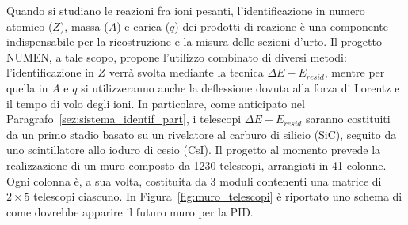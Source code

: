 




Quando si studiano le reazioni fra ioni pesanti, l'identificazione in numero atomico ($Z$), massa ($A$) e carica ($q$) dei prodotti di reazione è una componente indispensabile per la ricostruzione e la misura delle sezioni d'urto.
Il progetto NUMEN, a tale scopo, propone l'utilizzo combinato di diversi metodi: l'identificazione in $Z$ verrà svolta mediante la tecnica $\Delta E - E_{resid}$, mentre per quella in $A$ e $q$ si utilizzeranno anche la deflessione dovuta alla forza di Lorentz e il tempo di volo degli ioni.
In particolare, come anticipato nel Paragrafo~\ref{sez:sistema_identif_part}, i telescopi $\Delta E - E_{resid}$ saranno costituiti da un primo stadio basato su un rivelatore al carburo di silicio (SiC), seguito da uno scintillatore allo ioduro di cesio (CsI).
Il progetto al momento prevede la realizzazione di un muro composto da 1230 telescopi, arrangiati in 41 colonne.
Ogni colonna è, a sua volta, costituita da 3 moduli contenenti una matrice di $2 \times 5$ telescopi ciascuno.
In Figura~\ref{fig:muro_telescopi} è riportato uno schema di come dovrebbe apparire il futuro muro per la PID.

